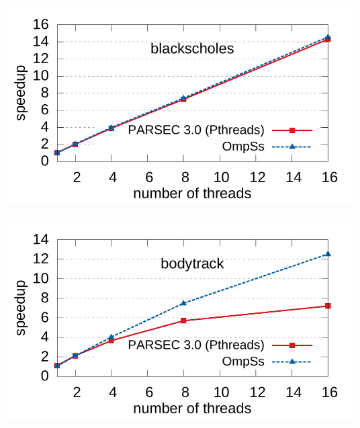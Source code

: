 \begin{figure}[p]
        \centering
        \begin{subfigure}{0.8\textwidth}
                \includegraphics[width=\textwidth]{task_benchmarks/figures/blackscholes_scale}
                \label{fig:blackscholes_scale}
        \end{subfigure}%
\hfill
        \begin{subfigure}{0.8\textwidth}
                \includegraphics[width=\textwidth]{task_benchmarks/figures/bodytrack_scale}
                \label{fig:bodytrack_scale}
        \end{subfigure}
        

\end{figure}
